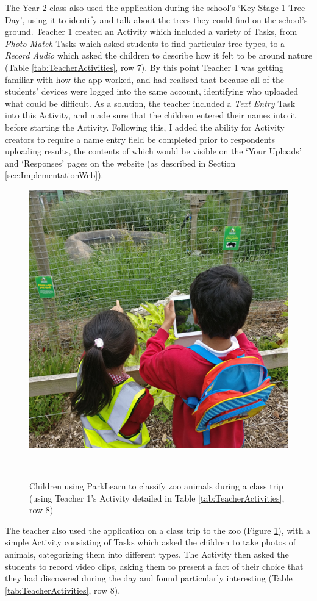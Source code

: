 The Year 2 class also used the application during the school's `Key Stage 1 Tree Day', using it to identify and talk about the trees they could find on the school's ground. Teacher 1 created an Activity which included a variety of Tasks, from \textit{Photo Match} Tasks which asked students to find particular tree types, to a \textit{Record Audio} which asked the children to describe how it felt to be around nature (Table \ref{tab:TeacherActivities}, row 7). By this point Teacher 1 was getting familiar with how the app worked, and had realised that because all of the students' devices were logged into the same account, identifying who uploaded what could be difficult. As a solution, the teacher included a \textit{Text Entry} Task into this Activity, and made sure that the children entered their names into it before starting the Activity. Following this, I added the ability for Activity creators to require a name entry field be completed prior to respondents uploading results, the contents of which would be visible on the `Your Uploads' and `Responses' pages on the website (as described in Section \ref{sec:ImplementationWeb}).

\begin{figure}
  \centering
  \includegraphics[width=0.7\columnwidth]{images/chapter07/zoo.jpg}
  \caption[Children using ParkLearn during a class trip to the zoo]{Children using ParkLearn to classify zoo animals during a class trip (using Teacher 1's Activity detailed in Table \ref{tab:TeacherActivities}, row 8)}~\label{fig:ParkLearnZoo}
\end{figure}

The teacher also used the application on a class trip to the zoo (Figure \ref{fig:ParkLearnZoo}), with a simple Activity consisting of Tasks which asked the children to take photos of animals, categorizing them into different types. The Activity then asked the students to record video clips, asking them to present a fact of their choice that they had discovered during the day and found particularly interesting (Table \ref{tab:TeacherActivities}, row 8).

